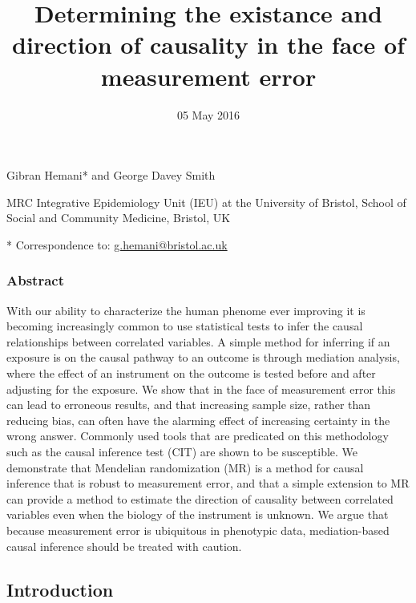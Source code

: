 \documentclass[]{article}
\title{Determining the existance and direction of causality in the face of
measurement error}
\author{}
\date{05 May 2016}
\begin{document}
\maketitle


Gibran Hemani* and George Davey Smith

MRC Integrative Epidemiology Unit (IEU) at the University of Bristol,
School of Social and Community Medicine, Bristol, UK

* Correspondence to:
\href{mailto:g.hemani@bristol.ac.uk}{g.hemani@bristol.ac.uk}

\subsubsection{Abstract}\label{abstract}

With our ability to characterize the human phenome ever improving it is
becoming increasingly common to use statistical tests to infer the
causal relationships between correlated variables. A simple method for
inferring if an exposure is on the causal pathway to an outcome is
through mediation analysis, where the effect of an instrument on the
outcome is tested before and after adjusting for the exposure. We show
that in the face of measurement error this can lead to erroneous
results, and that increasing sample size, rather than reducing bias, can
often have the alarming effect of increasing certainty in the wrong
answer. Commonly used tools that are predicated on this methodology such
as the causal inference test (CIT) are shown to be susceptible. We
demonstrate that Mendelian randomization (MR) is a method for causal
inference that is robust to measurement error, and that a simple
extension to MR can provide a method to estimate the direction of
causality between correlated variables even when the biology of the
instrument is unknown. We argue that because measurement error is
ubiquitous in phenotypic data, mediation-based causal inference should
be treated with caution.

\subsection{Introduction}\label{introduction}
\end{document}
